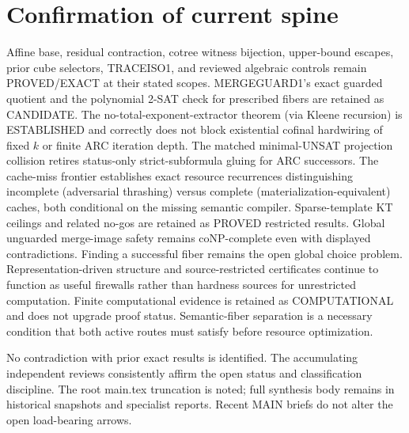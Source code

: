\documentclass[11pt]{article}
\begin{document}
\section{Confirmation of current spine}
Affine base, residual contraction, cotree witness bijection, upper-bound escapes, prior cube selectors, TRACEISO1, and reviewed algebraic controls remain PROVED/EXACT at their stated scopes. MERGEGUARD1's exact guarded quotient and the polynomial 2-SAT check for prescribed fibers are retained as CANDIDATE. The no-total-exponent-extractor theorem (via Kleene recursion) is ESTABLISHED and correctly does not block existential cofinal hardwiring of fixed \(k\) or finite ARC iteration depth. The matched minimal-UNSAT projection collision retires status-only strict-subformula gluing for ARC successors. The cache-miss frontier establishes exact resource recurrences distinguishing incomplete (adversarial thrashing) versus complete (materialization-equivalent) caches, both conditional on the missing semantic compiler. Sparse-template KT ceilings and related no-gos are retained as PROVED restricted results. Global unguarded merge-image safety remains coNP-complete even with displayed contradictions. Finding a successful fiber remains the open global choice problem. Representation-driven structure and source-restricted certificates continue to function as useful firewalls rather than hardness sources for unrestricted computation. Finite computational evidence is retained as COMPUTATIONAL and does not upgrade proof status. Semantic-fiber separation is a necessary condition that both active routes must satisfy before resource optimization.

No contradiction with prior exact results is identified. The accumulating independent reviews consistently affirm the open status and classification discipline. The root main.tex truncation is noted; full synthesis body remains in historical snapshots and specialist reports. Recent MAIN briefs do not alter the open load-bearing arrows.
\end{document}

